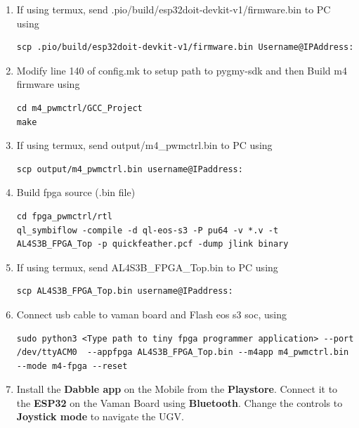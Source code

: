 \begin{enumerate}[label=\thesection.\arabic*.,ref=\thesection.\theenumi]
\item If using termux, send .pio/build/esp32doit-devkit-v1/firmware.bin to PC using
\begin{lstlisting}
scp .pio/build/esp32doit-devkit-v1/firmware.bin Username@IPAddress:
\end{lstlisting} 

\item  Modify line 140 of config.mk to setup path to pygmy-sdk and then Build m4 firmware using
\begin{lstlisting}
cd m4_pwmctrl/GCC_Project
make
\end{lstlisting}

\item If using termux, send output/m4{\_}pwmctrl.bin to PC using
\begin{lstlisting}
scp output/m4_pwmctrl.bin username@IPaddress:
\end{lstlisting} 

\item Build fpga source (.bin file)
\begin{lstlisting}
cd fpga_pwmctrl/rtl
ql_symbiflow -compile -d ql-eos-s3 -P pu64 -v *.v -t AL4S3B_FPGA_Top -p quickfeather.pcf -dump jlink binary 
\end{lstlisting} 

\item If using termux, send AL4S3B{\_}FPGA{\_}Top.bin to PC using
\begin{lstlisting}
scp AL4S3B_FPGA_Top.bin username@IPaddress:
\end{lstlisting} 

\item Connect usb cable to vaman board and Flash eos s3 soc, using
\begin{lstlisting}
sudo python3 <Type path to tiny fpga programmer application> --port /dev/ttyACM0  --appfpga AL4S3B_FPGA_Top.bin --m4app m4_pwmctrl.bin --mode m4-fpga --reset
\end{lstlisting} 

\item Install the \textbf{Dabble app} on the Mobile from the \textbf{Playstore}. Connect it to the \textbf{ESP32} on the Vaman Board using \textbf{Bluetooth}. Change the controls to \textbf{Joystick mode} to navigate the UGV.\\


\end{enumerate}